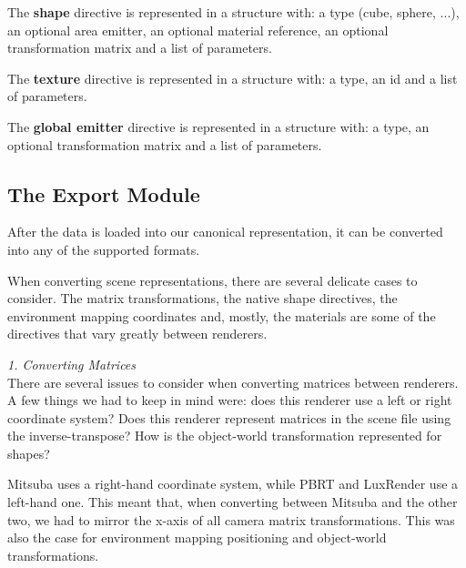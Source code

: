 The \textbf{shape} directive is represented in a structure with: a type (cube,
sphere, ...), an optional area emitter, an optional material reference, an
optional transformation matrix and a list of parameters.

The \textbf{texture} directive is represented in a structure with: a type, an id and a list of parameters. 

The \textbf{global emitter} directive is represented in a structure with: a
type, an optional transformation matrix and a list of parameters.

\subsection{The Export Module}
After the data is loaded into our canonical
representation, it can be converted into any of the supported formats.

When converting scene representations, there are several delicate cases to
consider. The matrix transformations, the native shape
directives, the environment mapping coordinates and, mostly, the materials are
some of the directives that vary greatly between renderers. 

\textit{1. Converting Matrices} \\
There are several issues to consider when converting matrices between renderers.
A few things we had to keep in mind were: does this renderer use a left or right
coordinate system? Does this renderer represent matrices in the scene file using
the inverse-transpose? How is the object-world transformation represented for
shapes?

Mitsuba uses a right-hand coordinate system, while PBRT and LuxRender use a
left-hand one. This meant that, when converting between Mitsuba and the other
two, we had to mirror the x-axis of all camera matrix transformations. This was
also the case for environment mapping positioning and object-world
transformations.


